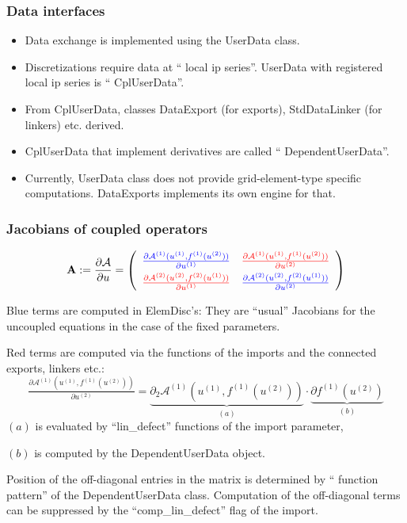 \begin {frame} [t]
\frametitle {Data interfaces}
\begin {itemize}
	\item Data exchange is implemented using the {\color{blue} UserData} class.
	\item Discretizations require data at ``{\color{blue} local ip series}''. UserData
	 with registered local ip series is ``{\color{blue} CplUserData}''.
	\item From CplUserData, classes DataExport (for exports), StdDataLinker (for linkers) etc. derived.
	\item CplUserData that implement derivatives are called ``{\color{blue} DependentUserData}''.
	\pause
	\item Currently, UserData class does not provide grid-element-type specific computations.
	 DataExports implements its own engine for that.
\end {itemize}
\end {frame}

\begin {frame} [t]
\frametitle {Jacobians of coupled operators}
$$
 \mathbf{A} := \dfrac{\partial{\mathcal{A}}}{\partial u} =
 \left (
  \begin {array} {cc}
   {\color{blue} \tfrac{\partial \mathcal{A}^{(1)} (u^{(1)}, f^{(1)} (u^{(2)}))}{\partial u^{(1)}}}
    & {\color{red} \tfrac{\partial \mathcal{A}^{(1)} (u^{(1)}, f^{(1)} (u^{(2)}))}{\partial u^{(2)}}} \\[1ex]
   {\color{red} \tfrac{\partial \mathcal{A}^{(2)} (u^{(2)}, f^{(2)} (u^{(1)}))}{\partial u^{(1)}}}
    & {\color{blue} \tfrac{\partial \mathcal{A}^{(2)} (u^{(2)}, f^{(2)} (u^{(1)}))}{\partial u^{(2)}}}
  \end {array}
 \right )
$$

\vspace{2ex}
%
{%
{\color{blue} Blue terms} are computed in ElemDisc's: They are ``usual''
Jacobians for the uncoupled equations in the case of the fixed parameters.}
%
{%
{\color{red} Red terms} are computed via the functions of the imports
and the connected exports, linkers etc.:
$$
 \tfrac{\partial \mathcal{A}^{(1)} (u^{(1)}, f^{(1)} (u^{(2)}))}{\partial u^{(2)}}
  = \underbrace{\partial_2 \mathcal{A}^{(1)} (u^{(1)}, f^{(1)} (u^{(2)}))}_{(a)}
   \cdot \underbrace{\partial f^{(1)} (u^{(2)})}_{(b)}
$$
$(a)$ is evaluated by ``lin\_defect'' functions of the import parameter,

$(b)$ is computed by the DependentUserData object.
}

%
{%
Position of the off-diagonal entries in the matrix is determined by ``{\color{blue} function pattern}''
of the DependentUserData class.
}
%
{%
Computation of the off-diagonal terms can be suppressed
by the ``comp\_lin\_defect'' flag of the import.
}
\end {frame}

